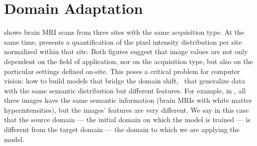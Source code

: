 

\section{Domain Adaptation}\label{sec:domain_adaptation}


 shows brain MRI scans from three sites with the same acquisition type. At the same time,  presents a quantification of the pixel intensity distribution per site normalized within that site. Both figures suggest that image values are not only dependent on the field of application, nor on the acquisition type, but also on the particular settings defined on-site. This poses a critical problem for computer vision: how to build models that bridge the domain shift, \ie~that generalize data with the same semantic distribution but different features. For example, in , all three images have the same semantic information (brain MRIs with white matter hyperintensities), but the images' features are very different. We say in this case that the source domain --- the initial domain on which the model is trained --- is different from the target domain --- the domain to which we are applying the model.


